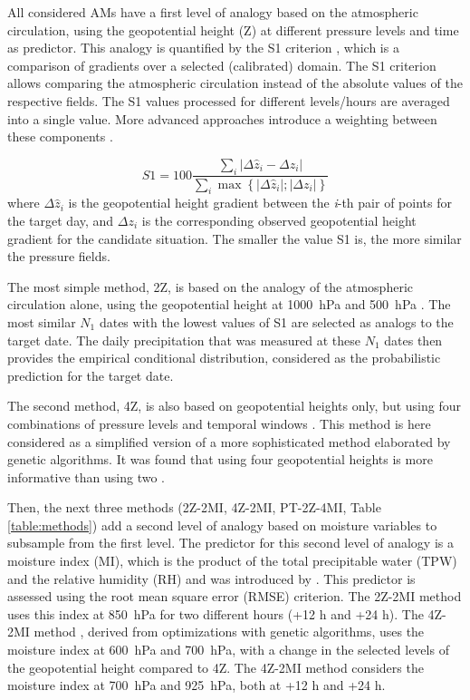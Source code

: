 \documentclass[alpha-refs]{wiley-article}
\begin{document}
All considered AMs have a first level of analogy based on the atmospheric circulation, using the geopotential height (Z) at different pressure levels and time as predictor. This analogy is quantified by the S1 criterion \citep[Eq.\ \ref{eq:S1}, ][]{Teweles1954, Brown2012}, which is a comparison of gradients over a selected (calibrated) domain. The S1 criterion allows comparing the atmospheric circulation instead of the absolute values of the respective fields. The S1 values processed for different levels/hours are averaged into a single value. More advanced approaches introduce a weighting between these components \citep{Horton2017a}.

\begin{equation}
	\label{eq:S1}
	S1=100 \frac{\sum_{i} \vert \Delta\hat{z}_{i} - \Delta z_{i} \vert}{\sum_{i} \max\left\lbrace \vert \Delta\hat{z}_{i} \vert; \vert \Delta z_{i} \vert \right\rbrace }
\end{equation}
where $\Delta \hat{z}_{i}$ is the geopotential height gradient between the \textit{i}-th pair of points for the target day, and $\Delta z_{i}$ is the corresponding observed geopotential height gradient for the candidate situation. The smaller the value S1 is, the more similar the pressure fields.

The most simple method, 2Z, is based on the analogy of the atmospheric circulation alone, using the geopotential height at 1000~hPa and 500~hPa \citep{Bontron2004}. The most similar $N_{1}$ dates with the lowest values of S1 are selected as analogs to the target date. The daily precipitation that was measured at these $N_{1}$ dates then provides the empirical conditional distribution, considered as the probabilistic prediction for the target date.

The second method, 4Z, is also based on geopotential heights only, but using four combinations of pressure levels and temporal windows \citep{Horton2018a}. This method is here considered as a simplified version of a more sophisticated method elaborated by genetic algorithms. It was found that using four geopotential heights is more informative than using two \citep{Horton2018a}.

Then, the next three methods (2Z-2MI, 4Z-2MI, PT-2Z-4MI, Table \ref{table:methods}) add a second level of analogy based on moisture variables to subsample from the first level. The predictor for this second level of analogy is a moisture index (MI), which is the product of the total precipitable water (TPW) and the relative humidity (RH) and was introduced by \citet{Bontron2004}. This predictor is assessed using the root mean square error (RMSE) criterion. The 2Z-2MI method \citep{Bontron2004} uses this index at 850~hPa for two different hours (+12 h and +24 h). The 4Z-2MI method \citep{Horton2018a}, derived from optimizations with genetic algorithms, uses the moisture index at 600~hPa and 700~hPa, with a change in the selected levels of the geopotential height compared to 4Z. The 4Z-2MI method \citep{BenDaoud2016} considers the moisture index at 700~hPa and 925~hPa, both at +12 h and +24 h.
\end{document}
